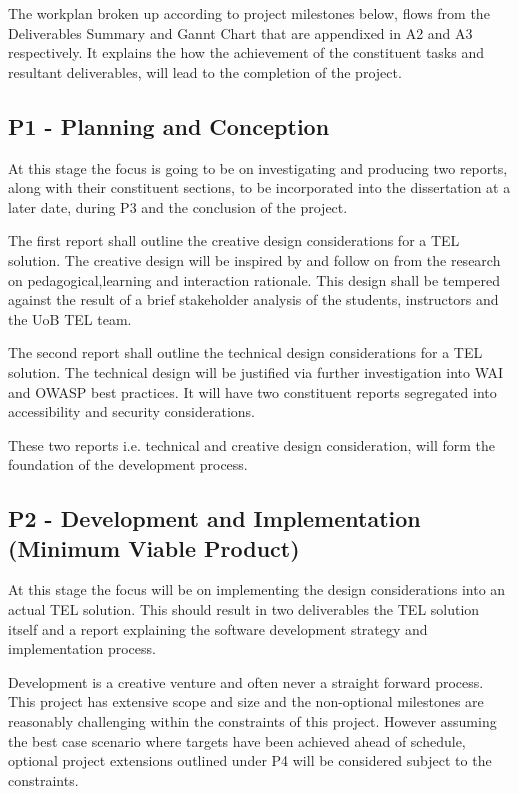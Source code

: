 The workplan broken up according to project milestones below, flows from the Deliverables Summary and Gannt Chart that are appendixed in A2 and A3 respectively. It explains the how the achievement of the  constituent tasks and resultant deliverables, will lead to the completion of the project.

\subsection{P1 - Planning and Conception}

At this stage the focus is going to be on investigating and producing two reports, along with their constituent sections, to be incorporated into the dissertation at a later date, during P3 and the conclusion of the project.

The first report shall outline the creative design considerations for a TEL solution. The creative design will be inspired by and follow on from the research  on pedagogical,learning and interaction rationale. This design shall be tempered against the result of a brief stakeholder analysis of the students, instructors and the UoB TEL team.

The second report shall outline the technical design considerations for a TEL solution. The technical design will be justified via further investigation into WAI and OWASP best practices. It will have two constituent reports segregated into accessibility and security considerations.

These two reports i.e. technical and creative design consideration, will form the foundation of the development process.

\subsection{P2 - Development and Implementation (Minimum Viable Product)}

At this stage the focus will be on implementing the design considerations into an actual TEL solution. This should result in two deliverables the TEL solution itself and a report explaining the software development strategy and implementation process.

Development is a creative venture and often never a straight forward process. This project has extensive scope and size and the non-optional milestones are reasonably challenging within the constraints of this project. However assuming the best case scenario where targets have been achieved ahead of schedule, optional project extensions outlined under P4 will be considered subject to the constraints.


